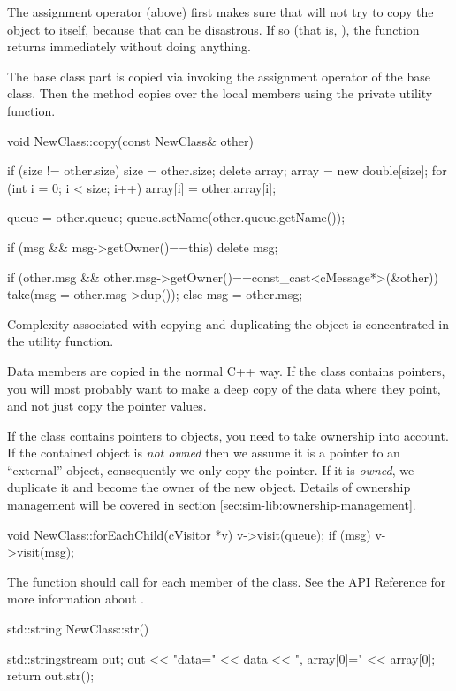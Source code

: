 The assignment operator (above) first makes sure that will not try to copy
the object to itself, because that can be disastrous. If so (that is,
), the function returns immediately without doing anything.

The base class part is copied via invoking the assignment operator of
the base class. Then the method copies over the local members using the
 private utility function.

\begin{cpp}
void NewClass::copy(const NewClass& other)
{
    if (size != other.size) {
        size = other.size;
        delete array;
        array = new double[size];
    }
    for (int i = 0; i < size; i++)
        array[i] = other.array[i];

    queue = other.queue;
    queue.setName(other.queue.getName());

    if (msg && msg->getOwner()==this)
        delete msg;

    if (other.msg && other.msg->getOwner()==const_cast<cMessage*>(&other))
        take(msg = other.msg->dup());
    else
        msg = other.msg;
}
\end{cpp}

Complexity associated with copying and duplicating the object
is concentrated in the  utility function.

Data members are copied in the normal C++ way. If the class
contains pointers, you will most probably want to make a deep copy of
the data where they point, and not just copy the pointer values.

If the class contains pointers to {\opp} objects, you need
to take ownership into account. If the contained object is \textit{not owned}
then we assume it is a pointer to an ``external'' object, consequently
we only copy the pointer. If it is \textit{owned}, we duplicate
it and become the owner of the new object. Details of ownership
management will be covered in section \ref{sec:sim-lib:ownership-management}.


\begin{cpp}
void NewClass::forEachChild(cVisitor *v)
{
    v->visit(queue);
    if (msg)
        v->visit(msg);
}
\end{cpp}

The  function should call 
for each  member of the class. See the API Reference for more
information about .

\begin{cpp}
std::string NewClass::str()
{
    std::stringstream out;
    out << "data=" << data << ", array[0]=" << array[0];
    return out.str();

}
\end{cpp}

